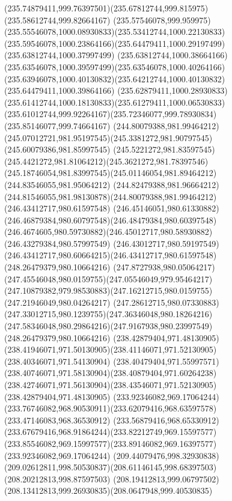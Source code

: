 {{		\curveto(235.74879411,999.76397501)(235.67812744,999.815975)(235.58612744,999.82664167)
		\curveto(235.57546078,999.959975)(235.55546078,1000.08930833)(235.53412744,1000.22130833)
		\curveto(235.59546078,1000.23864166)(235.64479411,1000.29197499)(235.63812744,1000.37997499)
		\curveto(235.63812744,1000.38664166)(235.63546078,1000.39597499)(235.63546078,1000.40264166)
		\curveto(235.63946078,1000.40130832)(235.64212744,1000.40130832)(235.64479411,1000.39864166)
		\curveto(235.62879411,1000.28930833)(235.61412744,1000.18130833)(235.61279411,1000.06530833)
		\curveto(235.61012744,999.92264167)(235.72346077,999.78930834)(235.85146077,999.74664167)
		\moveto(244.80079388,981.99464212)
		\curveto(245.07012721,981.95197545)(245.3381272,981.90797545)(245.60079386,981.85997545)
		\curveto(245.5221272,981.83597545)(245.4421272,981.81064212)(245.3621272,981.78397546)
		\curveto(245.18746054,981.83997545)(245.01146054,981.89464212)(244.83546055,981.95064212)
		\curveto(244.82479388,981.96664212)(244.81546055,981.98130878)(244.80079388,981.99464212)
		\moveto(246.43412717,980.61597548)
		\curveto(246.45146051,980.61330882)(246.46879384,980.60797548)(246.48479384,980.60397548)
		\curveto(246.4674605,980.59730882)(246.45012717,980.58930882)(246.43279384,980.57997549)
		\curveto(246.43012717,980.59197549)(246.43412717,980.60664215)(246.43412717,980.61597548)
		\moveto(248.26479379,980.10664216)
		\curveto(247.8727938,980.05064217)(247.45546048,980.0159755)(247.05546049,979.95464217)
		\curveto(247.10879382,979.98530883)(247.16212715,980.0159755)(247.21946049,980.04264217)
		\curveto(247.28612715,980.07330883)(247.33012715,980.1239755)(247.36346048,980.18264216)
		\curveto(247.58346048,980.29864216)(247.9167938,980.23997549)(248.26479379,980.10664216)
		\moveto(238.42879404,971.48130905)
		\curveto(238.41946071,971.50130905)(238.41146071,971.52130905)(238.40346071,971.54130904)
		\curveto(238.40479404,971.55997571)(238.40746071,971.58130904)(238.40879404,971.60264238)
		\curveto(238.42746071,971.56130904)(238.43546071,971.52130905)(238.42879404,971.48130905)
		\moveto(233.92346082,969.17064244)
		\curveto(233.76746082,968.90530911)(233.62079416,968.63597578)(233.47146083,968.36530912)
		\curveto(233.56879416,968.65330912)(233.67679416,968.91864244)(233.82212749,969.15597577)
		\curveto(233.85546082,969.15997577)(233.89146082,969.16397577)(233.92346082,969.17064244)
		\moveto(209.44079476,998.32930838)
		\curveto(209.02612811,998.50530837)(208.61146145,998.68397503)(208.20212813,998.87597503)
		\curveto(208.19412813,999.06797502)(208.13412813,999.26930835)(208.0647948,999.40530835)
}}
